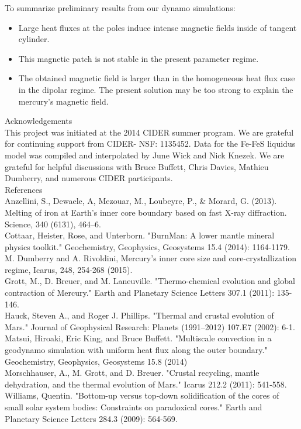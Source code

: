 \documentclass[landscape,a0b,final]{a0poster}
\begin{document}
\begin{multicols}{3}
To summarize preliminary results from our dynamo simulations:
\begin{itemize}
\item Large heat fluxes at the poles induce intense magnetic fields inside of tangent cylinder.
\item This magnetic patch is not stable in the present parameter regime.
\item The obtained magnetic field is larger than in the homogeneous heat flux case in the dipolar regime. The present solution may be too strong to explain the mercury's magnetic field.
\end{itemize}

{ \large Acknowledgements \\ \small
This project was initiated at the 2014 CIDER summer program.  We are grateful for continuing support from CIDER- NSF: 1135452.
Data for the Fe-FeS liquidus model was compiled and interpolated by June Wick and Nick Knezek.
We are grateful for helpful discussions with Bruce Buffett, Chris Davies, Mathieu Dumberry, and numerous CIDER participants.
}
\\
{ \large References \\ \tiny
Anzellini, S., Dewaele, A, Mezouar, M., Loubeyre, P., \& Morard, G. (2013). Melting of
iron at Earth’s inner core boundary based on fast X-ray diffraction. Science,
340 (6131), 464–6.\\
Cottaar, Heister, Rose, and Unterborn. "BurnMan: A lower mantle mineral physics toolkit." Geochemistry, Geophysics, Geosystems 15.4 (2014): 1164-1179. \\
M. Dumberry and A. Rivoldini, Mercury’s inner core size and core-crystallization regime, Icarus, 248, 254-268 (2015). \\
Grott, M., D. Breuer, and M. Laneuville. "Thermo-chemical evolution and global contraction of Mercury." Earth and Planetary Science Letters 307.1 (2011): 135-146. \\
Hauck, Steven A., and Roger J. Phillips. "Thermal and crustal evolution of Mars." Journal of Geophysical Research: Planets (1991–2012) 107.E7 (2002): 6-1. \\
Matsui, Hiroaki, Eric King, and Bruce Buffett. "Multiscale convection in a geodynamo simulation with uniform heat flux along the outer boundary." Geochemistry, Geophysics, Geosystems 15.8 (2014) \\
Morschhauser, A., M. Grott, and D. Breuer. "Crustal recycling, mantle dehydration, and the thermal evolution of Mars." Icarus 212.2 (2011): 541-558. \\
Williams, Quentin. "Bottom-up versus top-down solidification of the cores of small solar system bodies: Constraints on paradoxical cores." Earth and Planetary Science Letters 284.3 (2009): 564-569.
 }

\end{multicols}
\end{document}
